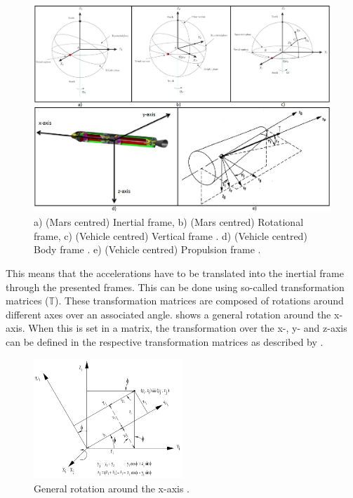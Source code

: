 \begin{figure}[H]
\centering
\includegraphics[width=1.0\textwidth]{figures/reference_frames/allFiveReferenceFrames_mooij2013fd-trinidad2012-mooij1994motion.jpg}
\caption{a) (Mars centred) Inertial frame, b) (Mars centred) Rotational frame, c) (Vehicle centred) Vertical frame \citep{mooij2013fd}. d) (Vehicle centred) Body frame \citep{trinidad2012}. e) (Vehicle centred) Propulsion frame \citep{mooij1994motion}.}
\label{fig:allFiveReferenceFrames_mooij2013fd-trinidad2012-mooij1994motion}
\end{figure}

This means that the accelerations have to be translated into the inertial frame through the presented frames. This can be done using so-called transformation matrices ($\mathbb{T}$). These transformation matrices are composed of rotations around different axes over an associated angle.  shows a general rotation around the x-axis. When this is set in a matrix, the transformation over the x-, y- and z-axis can be defined in the respective transformation matrices as described by . 


\begin{figure}[!ht]
\centering
\includegraphics[width=0.5\textwidth]{figures/reference_frames/xtrans_mooij2013stat.jpg}
\caption{General rotation around the x-axis \cite{mooij2013stat}.}
\label{fig:exampleXtrans_mooij2013stat}
\end{figure}


